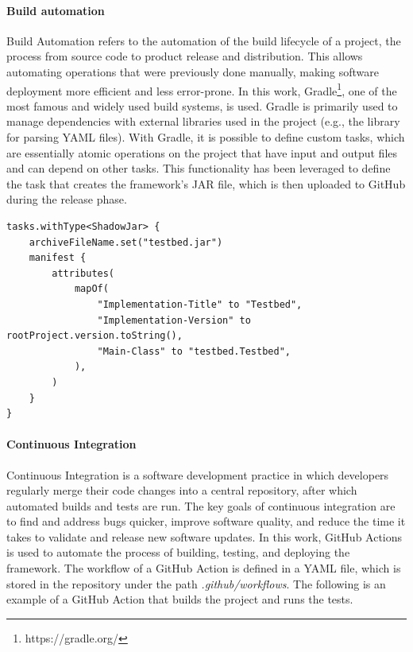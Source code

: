 \documentclass[12pt,a4paper,openright,twoside]{book}
\begin{document}
\paragraph*{Build automation}
Build Automation refers to the automation of the build lifecycle of a project, the process from source code to product release and distribution. 
This allows automating operations that were previously done manually, making software deployment more efficient and less error-prone.
In this work, Gradle\footnote{https://gradle.org/}, one of the most famous and widely used build systems, is used. 
Gradle is primarily used to manage dependencies with external libraries used in the project (e.g., the library for parsing YAML files).
With Gradle, it is possible to define custom tasks, which are essentially atomic operations on the project that have input and output files and can depend on other tasks. 
This functionality has been leveraged to define the task that creates the framework's JAR file, which is then uploaded to GitHub during the release phase.

\begin{lstlisting}[language=my-kotlin, caption={Custom task to generate the JAR file}]
  tasks.withType<ShadowJar> {
    archiveFileName.set("testbed.jar")
    manifest {
        attributes(
            mapOf(
                "Implementation-Title" to "Testbed",
                "Implementation-Version" to rootProject.version.toString(),
                "Main-Class" to "testbed.Testbed",
            ),
        )
    }
}
\end{lstlisting}

\paragraph*{Continuous Integration}
Continuous Integration is a software development practice in which developers regularly merge their code changes into a central repository, after which automated builds and tests are run.
The key goals of continuous integration are to find and address bugs quicker, improve software quality, and reduce the time it takes to validate and release new software updates.
In this work, GitHub Actions is used to automate the process of building, testing, and deploying the framework.
The workflow of a GitHub Action is defined in a YAML file, which is stored in the repository under the path \textit{.github/workflows}.
The following is an example of a GitHub Action that builds the project and runs the tests.
\end{document}
